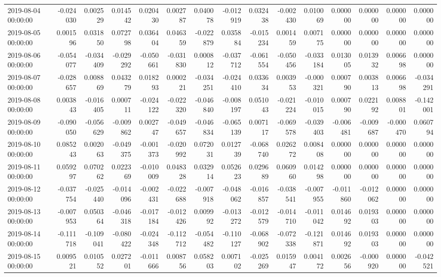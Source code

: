 \begin{tabular}{lrrrrrrrrrrrrrr}
2019-08-04 00:00:00 & -0.024030 & 0.002529 & 0.014542 & 0.020430 & 0.002787 & 0.040078 & -0.012919 & 0.032438 & -0.002430 & 0.010069 & 0.000000 & 0.000000 & 0.000000 & 0.000000 \\
2019-08-05 00:00:00 & 0.001596 & 0.031850 & 0.072798 & 0.036404 & 0.046359 & -0.022879 & 0.035884 & -0.015234 & 0.001459 & 0.007175 & 0.000000 & 0.000000 & 0.000000 & 0.000000 \\
2019-08-06 00:00:00 & -0.054077 & -0.034409 & -0.029292 & -0.050661 & -0.031830 & 0.000812 & -0.037712 & -0.061554 & -0.050456 & -0.033184 & 0.013005 & 0.013932 & 0.006698 & 0.000000 \\
2019-08-07 00:00:00 & -0.028657 & 0.008869 & 0.043279 & 0.018293 & 0.000221 & -0.034251 & -0.024410 & 0.033634 & 0.003953 & -0.000321 & 0.000790 & 0.003813 & 0.006698 & -0.034291 \\
2019-08-08 00:00:00 & 0.003843 & -0.016405 & 0.000711 & -0.024122 & -0.022320 & -0.046840 & -0.008197 & 0.051043 & -0.021224 & -0.010015 & 0.000790 & 0.022192 & 0.008801 & -0.142001 \\
2019-08-09 00:00:00 & -0.090050 & -0.056629 & -0.009862 & 0.002747 & -0.049657 & -0.046834 & -0.065139 & 0.007117 & -0.069578 & -0.039403 & -0.006481 & -0.009687 & -0.000470 & 0.060794 \\
2019-08-10 00:00:00 & 0.085243 & 0.002063 & -0.049375 & -0.001373 & -0.020992 & 0.072031 & 0.012739 & -0.068740 & 0.026272 & 0.008408 & 0.000000 & 0.000000 & 0.000000 & 0.000000 \\
2019-08-11 00:00:00 & 0.059297 & 0.070262 & 0.022369 & -0.010009 & 0.048328 & 0.032914 & 0.052623 & 0.029689 & 0.060960 & 0.014298 & 0.000000 & 0.000000 & 0.000000 & 0.000000 \\
2019-08-12 00:00:00 & -0.037754 & -0.025440 & -0.014096 & -0.002431 & -0.022688 & -0.007918 & -0.048062 & -0.016857 & -0.038541 & -0.007955 & -0.011860 & -0.012062 & 0.000000 & 0.000000 \\
2019-08-13 00:00:00 & -0.007953 & 0.050364 & -0.046318 & -0.017184 & -0.012426 & 0.009992 & -0.013272 & -0.012579 & -0.014710 & -0.011042 & 0.014692 & 0.019303 & 0.000000 & 0.000000 \\
2019-08-14 00:00:00 & -0.111718 & -0.109041 & -0.080422 & -0.024348 & -0.112712 & -0.054482 & -0.110127 & -0.068902 & -0.072338 & -0.121871 & 0.014692 & 0.019303 & 0.000000 & 0.000000 \\
2019-08-15 00:00:00 & 0.009521 & 0.010552 & 0.027201 & -0.011666 & 0.008756 & 0.058203 & 0.007102 & -0.025269 & 0.015947 & 0.004172 & 0.002656 & -0.000920 & 0.000000 & -0.042521 \\

\end{tabular}
